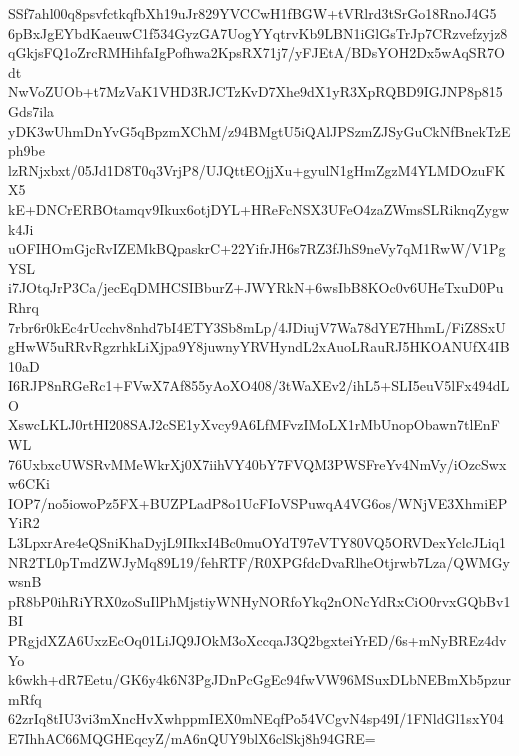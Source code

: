 SSf7ahl00q8psvfctkqfbXh19uJr829YVCCwH1fBGW+tVRlrd3tSrGo18RnoJ4G5
6pBxJgEYbdKaeuwC1f534GyzGA7UogYYqtrvKb9LBN1iGlGsTrJp7CRzvefzyjz8
qGkjsFQ1oZrcRMHihfaIgPofhwa2KpsRX71j7/yFJEtA/BDsYOH2Dx5wAqSR7Odt
NwVoZUOb+t7MzVaK1VHD3RJCTzKvD7Xhe9dX1yR3XpRQBD9IGJNP8p815Gds7ila
yDK3wUhmDnYvG5qBpzmXChM/z94BMgtU5iQAlJPSzmZJSyGuCkNfBnekTzEph9be
lzRNjxbxt/05Jd1D8T0q3VrjP8/UJQttEOjjXu+gyulN1gHmZgzM4YLMDOzuFKX5
kE+DNCrERBOtamqv9Ikux6otjDYL+HReFcNSX3UFeO4zaZWmsSLRiknqZygwk4Ji
uOFIHOmGjcRvIZEMkBQpaskrC+22YifrJH6s7RZ3fJhS9neVy7qM1RwW/V1PgYSL
i7JOtqJrP3Ca/jecEqDMHCSIBburZ+JWYRkN+6wsIbB8KOc0v6UHeTxuD0PuRhrq
7rbr6r0kEc4rUcchv8nhd7bI4ETY3Sb8mLp/4JDiujV7Wa78dYE7HhmL/FiZ8SxU
gHwW5uRRvRgzrhkLiXjpa9Y8juwnyYRVHyndL2xAuoLRauRJ5HKOANUfX4IB10aD
I6RJP8nRGeRc1+FVwX7Af855yAoXO408/3tWaXEv2/ihL5+SLI5euV5lFx494dLO
XswcLKLJ0rtHI208SAJ2cSE1yXvcy9A6LfMFvzIMoLX1rMbUnopObawn7tlEnFWL
76UxbxcUWSRvMMeWkrXj0X7iihVY40bY7FVQM3PWSFreYv4NmVy/iOzcSwxw6CKi
IOP7/no5iowoPz5FX+BUZPLadP8o1UcFIoVSPuwqA4VG6os/WNjVE3XhmiEPYiR2
L3LpxrAre4eQSniKhaDyjL9IIkxI4Bc0muOYdT97eVTY80VQ5ORVDexYclcJLiq1
NR2TL0pTmdZWJyMq89L19/fehRTF/R0XPGfdcDvaRlheOtjrwb7Lza/QWMGywsnB
pR8bP0ihRiYRX0zoSuIlPhMjstiyWNHyNORfoYkq2nONcYdRxCiO0rvxGQbBv1BI
PRgjdXZA6UxzEcOq01LiJQ9JOkM3oXccqaJ3Q2bgxteiYrED/6s+mNyBREz4dvYo
k6wkh+dR7Eetu/GK6y4k6N3PgJDnPcGgEc94fwVW96MSuxDLbNEBmXb5pzurmRfq
62zrIq8tIU3vi3mXncHvXwhppmIEX0mNEqfPo54VCgvN4sp49I/1FNldGl1sxY04
E7IhhAC66MQGHEqcyZ/mA6nQUY9blX6clSkj8h94GRE=
